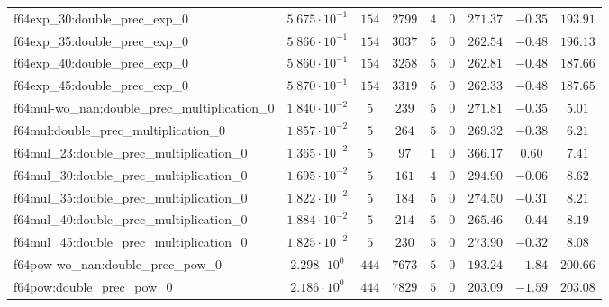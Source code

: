 \begin{tabular}{|l|c|c|c|c|c|c|c|c|}
f64exp\_30:double\_prec\_exp\_0                & $ 5.675 \cdot 10^{-1} $ & $ 154    $ & $ 2799   $ & $ 4   $ & $ 0   $ & $ 271.37      $ & $ -0.35   $ & $ 193.91  $ \\
f64exp\_35:double\_prec\_exp\_0                & $ 5.866 \cdot 10^{-1} $ & $ 154    $ & $ 3037   $ & $ 5   $ & $ 0   $ & $ 262.54      $ & $ -0.48   $ & $ 196.13  $ \\
f64exp\_40:double\_prec\_exp\_0                & $ 5.860 \cdot 10^{-1} $ & $ 154    $ & $ 3258   $ & $ 5   $ & $ 0   $ & $ 262.81      $ & $ -0.48   $ & $ 187.66  $ \\
f64exp\_45:double\_prec\_exp\_0                & $ 5.870 \cdot 10^{-1} $ & $ 154    $ & $ 3319   $ & $ 5   $ & $ 0   $ & $ 262.33      $ & $ -0.48   $ & $ 187.65  $ \\
f64mul-wo\_nan:double\_prec\_multiplication\_0 & $ 1.840 \cdot 10^{-2} $ & $ 5      $ & $ 239    $ & $ 5   $ & $ 0   $ & $ 271.81      $ & $ -0.35   $ & $ 5.01    $ \\
f64mul:double\_prec\_multiplication\_0         & $ 1.857 \cdot 10^{-2} $ & $ 5      $ & $ 264    $ & $ 5   $ & $ 0   $ & $ 269.32      $ & $ -0.38   $ & $ 6.21    $ \\
f64mul\_23:double\_prec\_multiplication\_0     & $ 1.365 \cdot 10^{-2} $ & $ 5      $ & $ 97     $ & $ 1   $ & $ 0   $ & $ 366.17      $ & $ 0.60    $ & $ 7.41    $ \\
f64mul\_30:double\_prec\_multiplication\_0     & $ 1.695 \cdot 10^{-2} $ & $ 5      $ & $ 161    $ & $ 4   $ & $ 0   $ & $ 294.90      $ & $ -0.06   $ & $ 8.62    $ \\
f64mul\_35:double\_prec\_multiplication\_0     & $ 1.822 \cdot 10^{-2} $ & $ 5      $ & $ 184    $ & $ 5   $ & $ 0   $ & $ 274.50      $ & $ -0.31   $ & $ 8.21    $ \\
f64mul\_40:double\_prec\_multiplication\_0     & $ 1.884 \cdot 10^{-2} $ & $ 5      $ & $ 214    $ & $ 5   $ & $ 0   $ & $ 265.46      $ & $ -0.44   $ & $ 8.19    $ \\
f64mul\_45:double\_prec\_multiplication\_0     & $ 1.825 \cdot 10^{-2} $ & $ 5      $ & $ 230    $ & $ 5   $ & $ 0   $ & $ 273.90      $ & $ -0.32   $ & $ 8.08    $ \\
f64pow-wo\_nan:double\_prec\_pow\_0            & $ 2.298 \cdot 10^{0}  $ & $ 444    $ & $ 7673   $ & $ 5   $ & $ 0   $ & $ 193.24      $ & $ -1.84   $ & $ 200.66  $ \\
f64pow:double\_prec\_pow\_0                    & $ 2.186 \cdot 10^{0}  $ & $ 444    $ & $ 7829   $ & $ 5   $ & $ 0   $ & $ 203.09      $ & $ -1.59   $ & $ 203.08  $ \\

\end{tabular}
